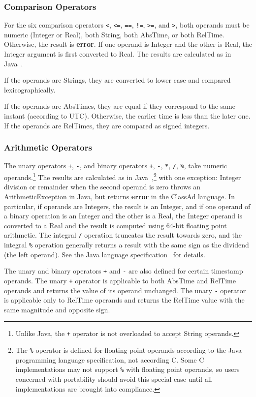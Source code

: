 \documentclass{article}
\begin{document}
\subsubsection{Comparison Operators}
For the six comparison operators
\verb|<|, \verb|<=|, \verb|==|, \verb|!=|, \verb|>=|, and \verb|>|,
both operands must be numeric (Integer or Real), both String, both AbsTime, or
both RelTime.
Otherwise, the result is \textbf{error}.
If one operand is Integer and the other is Real, the Integer argument is
first converted to Real.
The results are calculated as in Java~\cite{JLS}.

If the operands are Strings, they are converted to lower case and compared
lexicographically.

If the operands are AbsTimes, they are equal if they correspond to the same
instant (according to UTC).  Otherwise, the earlier time is less than the
later one.  If the operands are RelTimes, they are compared as signed integers.

\subsubsection{Arithmetic Operators}
The unary operators
\verb|+|,
\verb|-|,
and binary operators
\verb|+|,
\verb|-|,
\verb|*|,
\verb|/|,
\verb|%|,
take numeric operands.\footnote{Unlike Java, the \texttt{+} operator is not
overloaded to accept String operands.}
The results are calculated as in Java~\cite{JLS},\footnote{The
\texttt{\%} operator is defined for floating point operands according to the
Java programming language specification, not according C.
Some C implementations may not support \texttt{\%} with floating point operands,
so users concerned with portability should avoid this special case until all
implementations are brought into compliance.}
with one exception:
Integer division or
remainder when the second operand is zero throws an ArithmeticException in
Java, but returns \textbf{error} in the ClassAd language.
In particular, if operands are Integers, the result is an Integer, and if one
operand of a binary operation is an Integer and the other is a Real, the
Integer operand is converted to a Real and the result is computed using 64-bit
floating point arithmetic.
The integral \verb|/| operation truncates the result towards zero, and the
integral \verb|%| operation generally returns a result with the same sign as
the dividend (the left operand).
See the Java language specification~\cite{JLS} for details.

The unary and binary operators \verb|+| and \verb|-| are also defined for
certain timestamp operands.
The unary \verb|+| operator is applicable to both AbsTime and RelTime operands
and returns the value of its operand unchanged.
The unary \verb|-| operator is applicable only to RelTime operands and returns
the RelTime value with the same magnitude and opposite sign.
\end{document}
